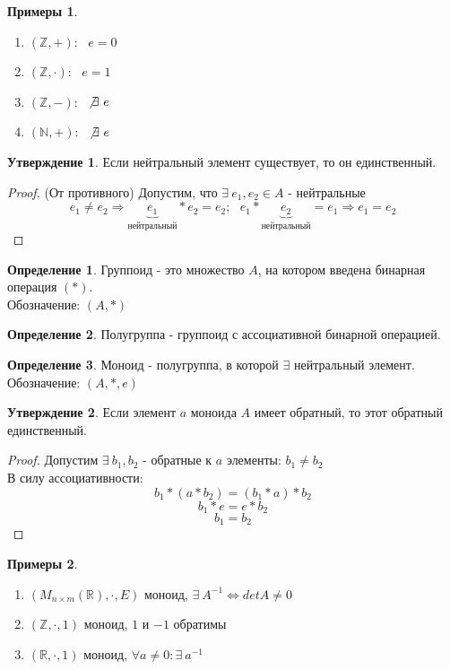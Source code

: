\documentclass[a4paper, 12pt]{article}
\newcommand{\R}{\mathbb R}
\newcommand{\Z}{\mathbb Z}
\newcommand{\N}{\mathbb N}
\newcommand\tab[1][.5cm]{\hspace*{#1}}
\theoremstyle{definition}
\newtheorem*{definition}{Определение}
\newtheorem*{subtheorem}{Утверждение}
\newtheorem*{example}{Примеры}
\begin{document}
  \begin{example}
    \begin{enumerate} \tab
      \item $(\Z, +)$: \ $e=0$  
      \item $(\Z, \cdot)$: \ $e=1$ 
      \item $(\Z, -)$: \ $\not \exists \ e$ 
      \item $(\N, +)$: \ $\not \exists \ e$ 
    \end{enumerate}
  \end{example}
  \begin{subtheorem}
    Если нейтральный элемент существует, то он единственный. 
  \end{subtheorem} 
  \begin{proof}
    (От противного) Допустим, что $\exists \ e_1,e_2 \in A$ - нейтральные
    $$e_1 \not = e_2 \Longrightarrow \underbrace{e_1}_{\text{нейтральный}}* e_2 = e_2; \ \ \ e_1 * \underbrace{e_2}_{\text{нейтральный}}= e_1 \Longrightarrow e_1 = e_2$$ 
  \end{proof} 
  \begin{definition}
    Группоид - это множество $A$, на котором введена бинарная операция $(*)$. \\
    Обозначение: $(A,*)$  
  \end{definition} 
  \begin{definition}
    Полугруппа - группоид с ассоциативной бинарной операцией.
  \end{definition} 
  \begin{definition}
    Моноид - полугруппа, в которой $\exists $ нейтральный элемент.\\ Обозначение: $(A,*,e)$ 
  \end{definition} 
  \begin{subtheorem}
    Если элемент $a$ моноида $A$ имеет обратный, то этот обратный единственный. 
  \end{subtheorem}
  \begin{proof}
    Допустим $\exists \ b_1,b_2$ - обратные к $a$ элементы: $b_1 \not = b_2$ \\
    В силу ассоциативности:
    $$b_1 * (a * b_2) = (b_1 * a) * b_2$$
    $$b_1 * e = e * b_2$$ 
    $$b_1 = b_2$$ 
  \end{proof} 
  \begin{example}
    \begin{enumerate} \tab
      \item $(M_{n \times m}(\R), \cdot, E)$ моноид, $\exists \ A^{-1} \Longleftrightarrow detA \not = 0$ 
      \item $(\Z, \cdot, 1)$ моноид, $1$ и $-1$ обратимы  
      \item $(\R, \cdot, 1)$ моноид, $\forall a \not =0:  \exists \ a^{-1}$ 
    \end{enumerate}
  \end{example}
\end{document}
